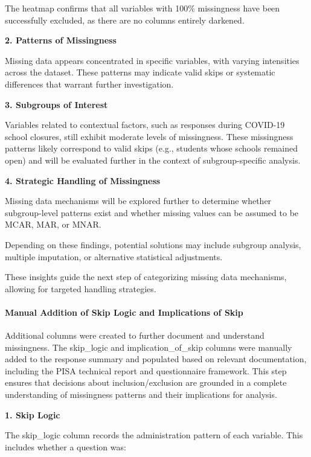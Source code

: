 \documentclass[
]{article}
\begin{document}
The heatmap confirms that all variables with 100\% missingness have been
successfully excluded, as there are no columns entirely darkened.

\textbf{2. Patterns of Missingness}

Missing data appears concentrated in specific variables, with varying
intensities across the dataset. These patterns may indicate valid skips
or systematic differences that warrant further investigation.

\textbf{3. Subgroups of Interest}

Variables related to contextual factors, such as responses during
COVID-19 school closures, still exhibit moderate levels of missingness.
These missingness patterns likely correspond to valid skips (e.g.,
students whose schools remained open) and will be evaluated further in
the context of subgroup-specific analysis.

\textbf{4. Strategic Handling of Missingness}

Missing data mechanisms will be explored further to determine whether
subgroup-level patterns exist and whether missing values can be assumed
to be MCAR, MAR, or MNAR.

Depending on these findings, potential solutions may include subgroup
analysis, multiple imputation, or alternative statistical adjustments.

These insights guide the next step of categorizing missing data
mechanisms, allowing for targeted handling strategies.

\hypertarget{manual-addition-of-skip-logic-and-implications-of-skip}{%
\paragraph{Manual Addition of Skip Logic and Implications of
Skip}\label{manual-addition-of-skip-logic-and-implications-of-skip}}

Additional columns were created to further document and understand
missingness. The skip\_logic and implication\_of\_skip columns were
manually added to the response summary and populated based on relevant
documentation, including the PISA technical report and questionnaire
framework. This step ensures that decisions about inclusion/exclusion
are grounded in a complete understanding of missingness patterns and
their implications for analysis.

\textbf{1. Skip Logic}

The skip\_logic column records the administration pattern of each
variable. This includes whether a question was:
\end{document}
